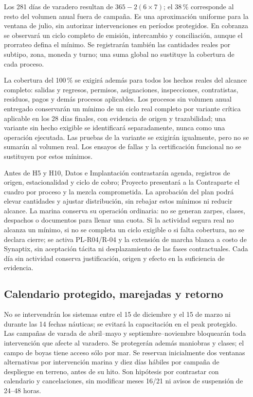 Los 281 días de varadero resultan de $365-2(6\times7)$; el 38\,\% corresponde al resto del volumen anual fuera de campaña. Es una aproximación uniforme para la ventana de julio, sin autorizar intervenciones en períodos protegidos. En cobranza se observará un ciclo completo de emisión, intercambio y conciliación, aunque el prorrateo defina el mínimo. Se registrarán también las cantidades reales por subtipo, zona, moneda y turno; una suma global no sustituye la cobertura de cada proceso.

La cobertura del 100\,\% se exigirá además para todos los hechos reales del alcance completo: salidas y regresos, permisos, asignaciones, inspecciones, contratistas, residuos, pagos y demás procesos aplicables. Los procesos sin volumen anual entregado conservarán un mínimo de un ciclo real completo por variante crítica aplicable en los 28 días finales, con evidencia de origen y trazabilidad; una variante sin hecho exigible se identificará separadamente, nunca como una operación ejecutada. Las pruebas de la variante se exigirán igualmente, pero no se sumarán al volumen real. Los ensayos de fallas y la certificación funcional no se sustituyen por estos mínimos.

Antes de H5 y H10, Datos e Implantación contrastarán agenda, registros de origen, estacionalidad y ciclo de cobro; Proyecto presentará a la Contraparte el cuadro por proceso y la mezcla comprometida. La aprobación del plan podrá elevar cantidades y ajustar distribución, sin rebajar estos mínimos ni reducir alcance. La marina conserva su operación ordinaria: no se generan zarpes, clases, despachos o documentos para llenar una cuota. Si la actividad segura real no alcanza un mínimo, si no se completa un ciclo exigible o si falta cobertura, no se declara cierre; se activa PL-R04/R-04 y la extensión de marcha blanca a costo de Synaptix, sin aceptación tácita ni desplazamiento de las fases contractuales. Cada día sin actividad conserva justificación, origen y efecto en la suficiencia de evidencia.\parencite[arts.~17.3 y 18, p.~13]{bases-admin}




\subsection{Calendario protegido, marejadas y retorno} %
No se intervendrán los sistemas entre el 15 de diciembre y el 15 de marzo ni durante las 14 fechas náuticas; se evitará la capacitación en el peak protegido. Las campañas de varada de abril--mayo y septiembre--noviembre bloquearán toda intervención que afecte al varadero. Se protegerán además maniobras y clases; el campo de boyas tiene acceso sólo por mar. Se reservan inicialmente dos ventanas alternativas por intervención marina y diez días hábiles por campaña de despliegue en terreno, antes de su hito. Son hipótesis por contrastar con calendario y cancelaciones, sin modificar meses 16/21 ni avisos de suspensión de 24--48 horas.

